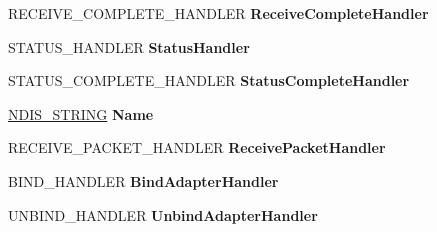 \begin{DoxyCompactItemize}
\begin{tabbing}
\end{tabbing}\item 
\mbox{\label{struct___n_d_i_s40___p_r_o_t_o_c_o_l___c_h_a_r_a_c_t_e_r_i_s_t_i_c_s_a22bc6205a25bb603f88e2c0339f8233e}} 
R\+E\+C\+E\+I\+V\+E\+\_\+\+C\+O\+M\+P\+L\+E\+T\+E\+\_\+\+H\+A\+N\+D\+L\+ER {\bfseries Receive\+Complete\+Handler}
\item 
\mbox{\label{struct___n_d_i_s40___p_r_o_t_o_c_o_l___c_h_a_r_a_c_t_e_r_i_s_t_i_c_s_ab205bcb5368f55e56ec7125a6e2d1776}} 
S\+T\+A\+T\+U\+S\+\_\+\+H\+A\+N\+D\+L\+ER {\bfseries Status\+Handler}
\item 
\mbox{\label{struct___n_d_i_s40___p_r_o_t_o_c_o_l___c_h_a_r_a_c_t_e_r_i_s_t_i_c_s_a01859a2ca4aefddb262570e79bc612d7}} 
S\+T\+A\+T\+U\+S\+\_\+\+C\+O\+M\+P\+L\+E\+T\+E\+\_\+\+H\+A\+N\+D\+L\+ER {\bfseries Status\+Complete\+Handler}
\item 
\mbox{\label{struct___n_d_i_s40___p_r_o_t_o_c_o_l___c_h_a_r_a_c_t_e_r_i_s_t_i_c_s_a13c1733a45d92dd65768d8410aaa1f7e}} 
\hyperlink{struct___u_n_i_c_o_d_e___s_t_r_i_n_g}{N\+D\+I\+S\+\_\+\+S\+T\+R\+I\+NG} {\bfseries Name}
\item 
\mbox{\label{struct___n_d_i_s40___p_r_o_t_o_c_o_l___c_h_a_r_a_c_t_e_r_i_s_t_i_c_s_aa0a4c272d9823de5d1402020db107a8e}} 
R\+E\+C\+E\+I\+V\+E\+\_\+\+P\+A\+C\+K\+E\+T\+\_\+\+H\+A\+N\+D\+L\+ER {\bfseries Receive\+Packet\+Handler}
\item 
\mbox{\label{struct___n_d_i_s40___p_r_o_t_o_c_o_l___c_h_a_r_a_c_t_e_r_i_s_t_i_c_s_a88ce62a4216752993b5551872aa86478}} 
B\+I\+N\+D\+\_\+\+H\+A\+N\+D\+L\+ER {\bfseries Bind\+Adapter\+Handler}
\item 
\mbox{\label{struct___n_d_i_s40___p_r_o_t_o_c_o_l___c_h_a_r_a_c_t_e_r_i_s_t_i_c_s_abb4dec044b976abf09f7af674f8f11af}} 
U\+N\+B\+I\+N\+D\+\_\+\+H\+A\+N\+D\+L\+ER {\bfseries Unbind\+Adapter\+Handler}

\end{DoxyCompactItemize}
